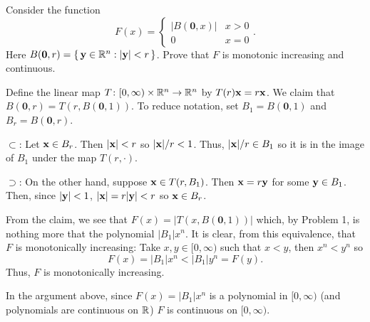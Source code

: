 \begin{problem}
  Consider the function
  \[
    F(x)=
    \begin{cases}
      |B(\mathbf{0},x)|&x>0\\
      0&x=0
    \end{cases}.
  \]
  Here $B(\mathbf{0},r)=\left\{\,\mathbf{y}\in\mathbb{R}^n:|\mathbf{y}|<r\,\right\}$. Prove
  that $F$ is monotonic increasing and continuous.
\end{problem}
\begin{solution}
  Define the linear map $T\colon[0,\infty)\times\mathbb{R}^n\to\mathbb{R}^n$ by
  $T(r)\mathbf{x}= r\mathbf{x}$. We claim that
  $B(\mathbf{0},r)=T(r,B(\mathbf{0},1))$. To reduce notation, set
  $B_1= B(\mathbf{0},1)$ and $B_r= B(\mathbf{0},r)$.
  \begin{solution}
    \renewcommand{\qedsymbol}{$\clubsuit$} $\subset$: Let $\mathbf{x}\in
    B_r$. Then $|\mathbf{x}|<r$ so $|\mathbf{x}|/r<1$. Thus, $|\mathbf{x}|/r\in B_1$ so it is
    in the image of $B_1$ under the map $T(r,\cdot)$.

    $\supset$: On the other hand, suppose $\mathbf{x}\in T(r,B_1)$. Then
    $\mathbf{x}=r\mathbf{y}$ for some $\mathbf{y}\in B_1$. Then, since $|\mathbf{y}|<1$,
    $|\mathbf{x}|=r|\mathbf{y}|<r$ so $\mathbf{x}\in B_r$.
  \end{solution}

  From the claim, we see that $F(x)=|T(x,B(\mathbf{0},1))|$ which, by
  Problem 1, is nothing more that the polynomial $|B_1|x^n$. It is clear,
  from this equivalence, that $F$ is monotonically increasing: Take
  $x,y\in[0,\infty)$ such that $x<y$, then $x^n<y^n$ so
  \begin{equation}
    \label{eq:prep:1:7}
    F(x)=|B_1|x^n<|B_1|y^n=F(y).
  \end{equation}
  Thus, $F$ is monotonically increasing.

  In the argument above, since $F(x)=|B_1|x^n$ is a polynomial in
  $[0,\infty)$ (and polynomials are continuous on $\mathbb{R}$) $F$ is continuous
  on $[0,\infty)$.
\end{solution}

